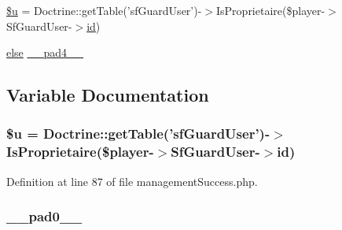 \begin{DoxyCompactItemize}
\item 
\hyperlink{frontend_2modules_2team_2templates_2management_success_8php_ad9bcfd597eba04db946451e8368a1f05}{\$u} = Doctrine\-::get\-Table('sf\-Guard\-User')-\/$>$Is\-Proprietaire(\$player-\/$>$Sf\-Guard\-User-\/$>$\hyperlink{live_2modules_2team_2templates_2management_success_8php_ad9851c94d15b310fef9eaded57c23ddf}{id})
\item 
\hyperlink{live_2modules_2team_2templates_2management_success_8php_a0544c3fe466e421738dae463968b70ba}{else} \hyperlink{frontend_2modules_2team_2templates_2management_success_8php_a4b953ca50a29aec287fd26dcb69696db}{\-\_\-\-\_\-pad4\-\_\-\-\_\-}
\end{DoxyCompactItemize}


\subsection{Variable Documentation}
\hypertarget{frontend_2modules_2team_2templates_2management_success_8php_ad9bcfd597eba04db946451e8368a1f05}{
\subsubsection[{\$u}]{\setlength{\rightskip}{0pt plus 5cm}\$u = Doctrine\-::get\-Table('sf\-Guard\-User')-\/$>$Is\-Proprietaire(\$player-\/$>$Sf\-Guard\-User-\/$>${\bf id})}}\label{frontend_2modules_2team_2templates_2management_success_8php_ad9bcfd597eba04db946451e8368a1f05}


Definition at line 87 of file management\-Success.\-php.

\hypertarget{frontend_2modules_2team_2templates_2management_success_8php_a8e01dcc96c43199448ee66f7c2ae8ea6}{
\subsubsection[{\-\_\-\-\_\-pad0\-\_\-\-\_\-}]{ \-\_\-\-\_\-pad0\-\_\-\-\_\-}}\label{frontend_2modules_2team_2templates_2management_success_8php_a8e01dcc96c43199448ee66f7c2ae8ea6}


